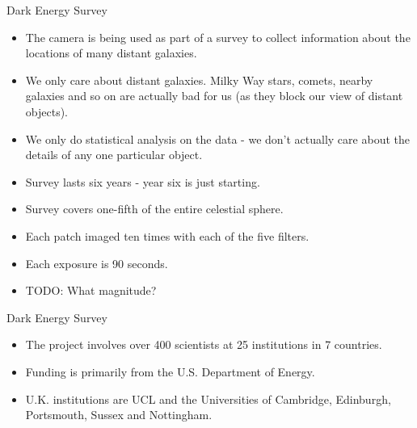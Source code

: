 \documentclass[usenames,dvipsnames]{beamer}
\begin{document}

\begin{frame}{Dark Energy Survey}
  \begin{block}{}
    \begin{itemize}
      \item{The camera is being used as part of a survey to collect information about the locations of many distant galaxies.}
      \item{We only care about distant galaxies. Milky Way stars, comets, nearby galaxies and so on are actually bad for us (as they block our view of distant objects).} 
      \item{We only do statistical analysis on the data - we don't actually care about the details of any one particular object.}
      \item{Survey lasts six years - year six is just starting.}
      \item{Survey covers one-fifth of the entire celestial sphere.}
      \item{Each patch imaged ten times with each of the five filters.}
      \item{Each exposure is 90 seconds.} %
      \item{TODO: What magnitude?}
    \end{itemize}
  \end{block}
\end{frame}


\begin{frame}{Dark Energy Survey}
  \begin{block}{}
    \begin{itemize}
      \item{The project involves over 400 scientists at 25 institutions in 7 countries.}
      \item{Funding is primarily from the U.S. Department of Energy.}
      \item{U.K. institutions are UCL and the Universities of Cambridge, Edinburgh, Portsmouth, Sussex and Nottingham.}
    \end{itemize}
  \end{block}
\end{frame}
\end{document}
